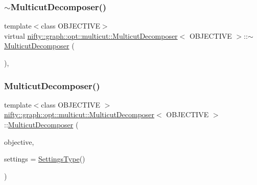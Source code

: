 \subsubsection{\texorpdfstring{$\sim$\+Multicut\+Decomposer()}{~MulticutDecomposer()}}
{\footnotesize\ttfamily template$<$class O\+B\+J\+E\+C\+T\+I\+VE$>$ \\
virtual \hyperlink{classnifty_1_1graph_1_1opt_1_1multicut_1_1MulticutDecomposer}{nifty\+::graph\+::opt\+::multicut\+::\+Multicut\+Decomposer}$<$ O\+B\+J\+E\+C\+T\+I\+VE $>$\+::$\sim$\hyperlink{classnifty_1_1graph_1_1opt_1_1multicut_1_1MulticutDecomposer}{Multicut\+Decomposer} (\begin{DoxyParamCaption}{ }\end{DoxyParamCaption})\hspace{0.3cm}{\ttfamily [inline]}, {\ttfamily [virtual]}}

\mbox{\label{classnifty_1_1graph_1_1opt_1_1multicut_1_1MulticutDecomposer_ac2f107b3f00f443f0154a2eceb1b7489}} 
\subsubsection{\texorpdfstring{Multicut\+Decomposer()}{MulticutDecomposer()}}
{\footnotesize\ttfamily template$<$class O\+B\+J\+E\+C\+T\+I\+VE $>$ \\
\hyperlink{classnifty_1_1graph_1_1opt_1_1multicut_1_1MulticutDecomposer}{nifty\+::graph\+::opt\+::multicut\+::\+Multicut\+Decomposer}$<$ O\+B\+J\+E\+C\+T\+I\+VE $>$\+::\hyperlink{classnifty_1_1graph_1_1opt_1_1multicut_1_1MulticutDecomposer}{Multicut\+Decomposer} (\begin{DoxyParamCaption}\item[{const \hyperlink{classnifty_1_1graph_1_1opt_1_1multicut_1_1MulticutDecomposer_ab70024cf8bdd7baea7842c33de022ffd}{Objective\+Type} \&}]{objective,  }\item[{const \hyperlink{structnifty_1_1graph_1_1opt_1_1multicut_1_1MulticutDecomposer_1_1SettingsType}{Settings\+Type} \&}]{settings = {\ttfamily \hyperlink{structnifty_1_1graph_1_1opt_1_1multicut_1_1MulticutDecomposer_1_1SettingsType}{Settings\+Type}()} }\end{DoxyParamCaption})}




